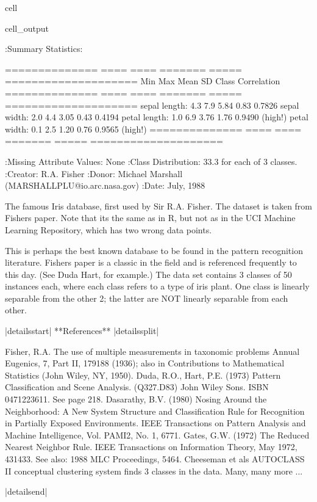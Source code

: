 \documentclass[letterpaper,10pt,english]{jupyterBook}
\begin{document}
\begin{sphinxuseclass}{cell}
\begin{sphinxVerbatimOutput}
\begin{sphinxuseclass}{cell_output}
\begin{sphinxVerbatim}[commandchars=\\\{\}]
    :Summary Statistics:

    ============== ==== ==== ======= ===== ====================
                    Min  Max   Mean    SD   Class Correlation
    ============== ==== ==== ======= ===== ====================
    sepal length:   4.3  7.9   5.84   0.83    0.7826
    sepal width:    2.0  4.4   3.05   0.43   \PYGZhy{}0.4194
    petal length:   1.0  6.9   3.76   1.76    0.9490  (high!)
    petal width:    0.1  2.5   1.20   0.76    0.9565  (high!)
    ============== ==== ==== ======= ===== ====================

    :Missing Attribute Values: None
    :Class Distribution: 33.3\PYGZpc{} for each of 3 classes.
    :Creator: R.A. Fisher
    :Donor: Michael Marshall (MARSHALL\PYGZpc{}PLU@io.arc.nasa.gov)
    :Date: July, 1988

The famous Iris database, first used by Sir R.A. Fisher. The dataset is taken
from Fisher\PYGZsq{}s paper. Note that it\PYGZsq{}s the same as in R, but not as in the UCI
Machine Learning Repository, which has two wrong data points.

This is perhaps the best known database to be found in the
pattern recognition literature.  Fisher\PYGZsq{}s paper is a classic in the field and
is referenced frequently to this day.  (See Duda \PYGZam{} Hart, for example.)  The
data set contains 3 classes of 50 instances each, where each class refers to a
type of iris plant.  One class is linearly separable from the other 2; the
latter are NOT linearly separable from each other.

|details\PYGZhy{}start|
**References**
|details\PYGZhy{}split|

\PYGZhy{} Fisher, R.A. \PYGZdq{}The use of multiple measurements in taxonomic problems\PYGZdq{}
  Annual Eugenics, 7, Part II, 179\PYGZhy{}188 (1936); also in \PYGZdq{}Contributions to
  Mathematical Statistics\PYGZdq{} (John Wiley, NY, 1950).
\PYGZhy{} Duda, R.O., \PYGZam{} Hart, P.E. (1973) Pattern Classification and Scene Analysis.
  (Q327.D83) John Wiley \PYGZam{} Sons.  ISBN 0\PYGZhy{}471\PYGZhy{}22361\PYGZhy{}1.  See page 218.
\PYGZhy{} Dasarathy, B.V. (1980) \PYGZdq{}Nosing Around the Neighborhood: A New System
  Structure and Classification Rule for Recognition in Partially Exposed
  Environments\PYGZdq{}.  IEEE Transactions on Pattern Analysis and Machine
  Intelligence, Vol. PAMI\PYGZhy{}2, No. 1, 67\PYGZhy{}71.
\PYGZhy{} Gates, G.W. (1972) \PYGZdq{}The Reduced Nearest Neighbor Rule\PYGZdq{}.  IEEE Transactions
  on Information Theory, May 1972, 431\PYGZhy{}433.
\PYGZhy{} See also: 1988 MLC Proceedings, 54\PYGZhy{}64.  Cheeseman et al\PYGZdq{}s AUTOCLASS II
  conceptual clustering system finds 3 classes in the data.
\PYGZhy{} Many, many more ...

|details\PYGZhy{}end|
\end{sphinxVerbatim}

\end{sphinxuseclass}\end{sphinxVerbatimOutput}

\end{sphinxuseclass}
\end{document}
